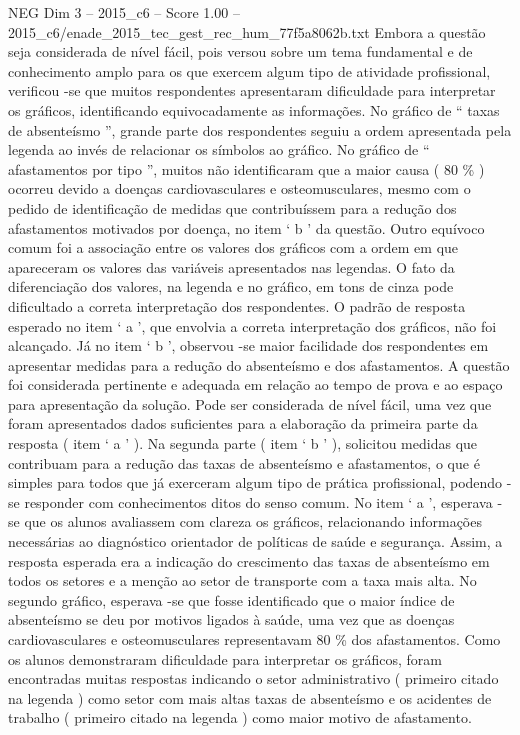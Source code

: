 \begin{textsample}{NEG Dim 3 – 2015\_c6 – Score 1.00 – 2015\_c6/enade\_2015\_tec\_gest\_rec\_hum\_77f5a8062b.txt}
Embora a questão seja considerada de nível fácil, pois versou sobre um tema fundamental e de conhecimento amplo para os que exercem algum tipo de atividade profissional, verificou -se que muitos respondentes apresentaram dificuldade para interpretar os gráficos, identificando equivocadamente as informações.
No gráfico de “ taxas de absenteísmo ”, grande parte dos respondentes seguiu a ordem apresentada pela legenda ao invés de relacionar os símbolos ao gráfico.
No gráfico de “ afastamentos por tipo ”, muitos não identificaram que a maior causa ( 80 \% ) ocorreu devido a doenças cardiovasculares e osteomusculares, mesmo com o pedido de identificação de medidas que contribuíssem para a redução dos afastamentos motivados por doença, no item ‘ b ’ da questão.
Outro equívoco comum foi a associação entre os valores dos gráficos com a ordem em que apareceram os valores das variáveis apresentados nas legendas.
O fato da diferenciação dos valores, na legenda e no gráfico, em tons de cinza pode dificultado a correta interpretação dos respondentes.
O padrão de resposta esperado no item ‘ a ’, que envolvia a correta interpretação dos gráficos, não foi alcançado.
Já no item ‘ b ’, observou -se maior facilidade dos respondentes em apresentar medidas para a redução do absenteísmo e dos afastamentos.
A questão foi considerada pertinente e adequada em relação ao tempo de prova e ao espaço para apresentação da solução.
Pode ser considerada de nível fácil, uma vez que foram apresentados dados suficientes para a elaboração da primeira parte da resposta ( item ‘ a ’ ).
Na segunda parte ( item ‘ b ’ ), solicitou medidas que contribuam para a redução das taxas de absenteísmo e afastamentos, o que é simples para todos que já exerceram algum tipo de prática profissional, podendo -se responder com conhecimentos ditos do senso comum.
No item ‘ a ’, esperava -se que os alunos avaliassem com clareza os gráficos, relacionando informações necessárias ao diagnóstico orientador de políticas de saúde e segurança.
Assim, a resposta esperada era a indicação do crescimento das taxas de absenteísmo em todos os setores e a menção ao setor de transporte com a taxa mais alta.
No segundo gráfico, esperava -se que fosse identificado que o maior índice de absenteísmo se deu por motivos ligados à saúde, uma vez que as doenças cardiovasculares e osteomusculares representavam 80 \% dos afastamentos.
Como os alunos demonstraram dificuldade para interpretar os gráficos, foram encontradas muitas respostas indicando o setor administrativo ( primeiro citado na legenda ) como setor com mais altas taxas de absenteísmo e os acidentes de trabalho ( primeiro citado na legenda ) como maior motivo de afastamento.

\end{textsample}
